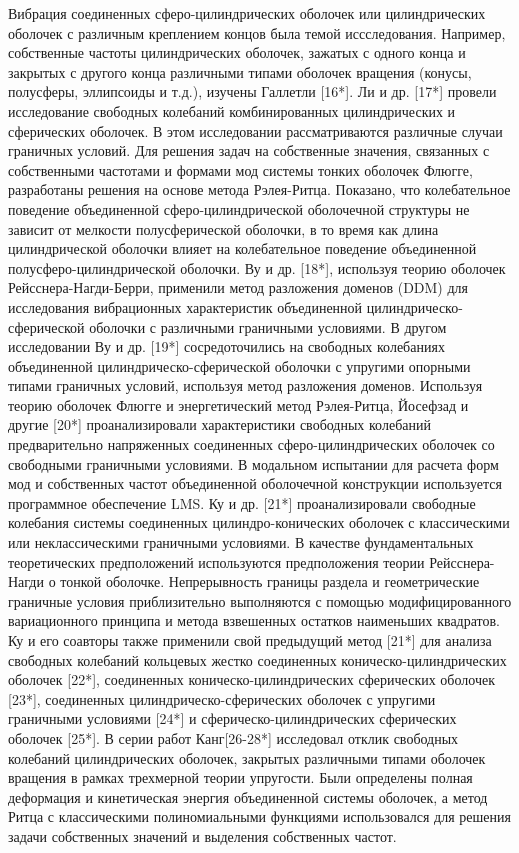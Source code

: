 Вибрация соединенных сферо-цилиндрических оболочек или цилиндрических оболочек с различным креплением концов была темой иссследования. Например, собственные частоты цилиндрических оболочек, зажатых с одного конца и закрытых с другого конца различными типами оболочек вращения (конусы, полусферы, эллипсоиды и т.д.), изучены Галлетли [16*]. Ли и др. [17*] провели исследование свободных колебаний комбинированных цилиндрических и сферических оболочек. В этом исследовании рассматриваются различные случаи граничных условий. Для решения задач на собственные значения, связанных с собственными частотами и формами мод системы тонких оболочек Флюгге, разработаны решения на основе метода Рэлея-Ритца. Показано, что колебательное поведение объединенной сферо-цилиндрической оболочечной структуры не зависит от мелкости полусферической оболочки, в то время как длина цилиндрической оболочки влияет на колебательное поведение объединенной полусферо-цилиндрической оболочки. Ву и др. [18*], используя теорию оболочек Рейсснера-Нагди-Берри, применили метод разложения доменов (DDM) для исследования вибрационных характеристик объединенной цилиндрическо-сферической оболочки с различными граничными условиями. В другом исследовании Ву и др. [19*] сосредоточились на свободных колебаниях объединенной цилиндрическо-сферической оболочки с упругими опорными типами граничных условий, используя метод разложения доменов. Используя теорию оболочек Флюгге и энергетический метод Рэлея-Ритца, Йосефзад и другие [20*] проанализировали характеристики свободных колебаний предварительно напряженных соединенных сферо-цилиндрических оболочек со свободными граничными условиями. В модальном испытании для расчета форм мод и собственных частот объединенной оболочечной конструкции используется программное обеспечение LMS. Ку и др. [21*] проанализировали свободные колебания системы соединенных цилиндро-конических оболочек с классическими или неклассическими граничными условиями. В качестве фундаментальных теоретических предположений используются предположения теории Рейсснера-Нагди о тонкой оболочке. Непрерывность границы раздела и геометрические граничные условия приблизительно выполняются с помощью модифицированного вариационного принципа и метода взвешенных остатков наименьших квадратов. Ку и его соавторы также применили свой предыдущий метод [21*] для анализа свободных колебаний кольцевых жестко соединенных коническо-цилиндрических оболочек [22*], соединенных коническо-цилиндрических сферических оболочек [23*], соединенных цилиндрическо-сферических оболочек с упругими граничными условиями [24*] и сферическо-цилиндрических сферических оболочек [25*]. В серии работ Канг[26-28*] исследовал отклик свободных колебаний цилиндрических оболочек, закрытых различными типами оболочек вращения в рамках трехмерной теории упругости. Были определены полная деформация и кинетическая энергия объединенной системы оболочек, а метод Ритца с классическими полиномиальными функциями использовался для решения задачи собственных значений и выделения собственных частот.


